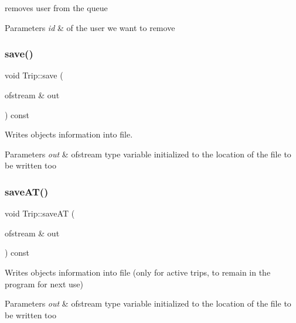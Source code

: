 removes user from the queue 


\begin{DoxyParams}{Parameters}
{\em id} & of the user we want to remove \\
\hline
\end{DoxyParams}
\mbox{\label{group___trip_ga6ae6134652b644fa63bf267b956f1e75}} 
\subsubsection{\texorpdfstring{save()}{save()}}
{\footnotesize\ttfamily void Trip\+::save (\begin{DoxyParamCaption}\item[{ofstream \&}]{out }\end{DoxyParamCaption}) const}



Writes object\textquotesingle{}s information into file. 


\begin{DoxyParams}{Parameters}
{\em out} & ofstream type variable initialized to the location of the file to be written too \\
\hline
\end{DoxyParams}
\mbox{\label{group___trip_gafcf569c0a9d6e5a47134f7e9dd62334a}} 
\subsubsection{\texorpdfstring{save\+A\+T()}{saveAT()}}
{\footnotesize\ttfamily void Trip\+::save\+AT (\begin{DoxyParamCaption}\item[{ofstream \&}]{out }\end{DoxyParamCaption}) const}



Writes object\textquotesingle{}s information into file (only for active trips, to remain in the program for next use) 


\begin{DoxyParams}{Parameters}
{\em out} & ofstream type variable initialized to the location of the file to be written too \\
\hline
\end{DoxyParams}
\mbox{\label{group___trip_ga26abc8edc0cb1f5c2eb1b6e292152701}} 
